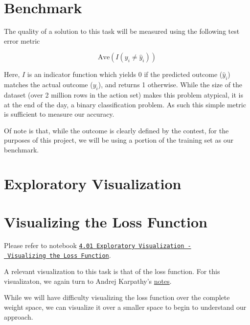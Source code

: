 \documentclass[]{report}
\newenvironment{Shaded}{}{}
\newcommand{\DecValTok}[1]{\textcolor[rgb]{0.25,0.63,0.44}{{#1}}}
\newcommand{\ImportTok}[1]{{#1}}
\newcommand{\OperatorTok}[1]{\textcolor[rgb]{0.40,0.40,0.40}{{#1}}}
\newcommand{\NormalTok}[1]{{#1}}
\begin{document}
\chapter{Benchmark}\label{benchmark}

The quality of a solution to this task will be measured using the
following test error metric

\[\text{Ave}(I(y_i\neq\hat{y}_i))\]

Here, \(I\) is an indicator function which yields 0 if the predicted
outcome (\(\hat{y}_i\)) matches the actual outcome (\(y_i\)), and
returns 1 otherwise. While the size of the dataset (over 2 million rows
in the action set) makes this problem atypical, it is at the end of the
day, a binary classification problem. As such this simple metric is
sufficient to measure our accuracy.

Of note is that, while the outcome is clearly defined by the contest,
for the purposes of this project, we will be using a portion of the
training set as our benchmark.

\chapter{Exploratory Visualization}

\chapter{Visualizing the Loss
Function}\label{visualizing-the-loss-function}

Please refer to notebook
\href{http://joshuacook.me:8003/notebooks/ipynb/4.01\%20Exploratory\%20Visualization\%20-\%20Visualizing\%20the\%20Loss\%20Function.ipynb}{\texttt{4.01\ Exploratory\ Visualization\ -\ Visualizing\ the\ Loss\ Function}}.

A relevant visualization to this task is that of the loss function. For
this visualizaton, we again turn to Andrej Karpathy's
\href{http://cs231n.github.io/optimization-1/}{notes}.

While we will have difficulty visualizing the loss function over the
complete weight space, we can visualize it over a smaller space to begin
to understand our approach.

\begin{Shaded}
\end{Shaded}
\end{document}
